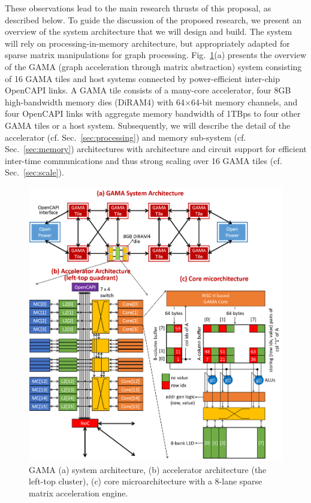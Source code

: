 These observations lead to the main research thrusts of this proposal, as described below. 
To guide the discussion of the proposed research, we present an overview of the system architecture that we will design and build. 
The system will rely on processing-in-memory architecture, but appropriately adapted for sparse matrix manipulations for graph processing. 
Fig.~\ref{fig:arch}(a) presents the overview of the GAMA (graph acceleration through matrix abstraction) system consisting of 16 GAMA tiles and host systems connected by power-efficient inter-chip OpenCAPI links.
A GAMA tile consists of a many-core accelerator, four 8GB high-bandwidth memory dies (DiRAM4) with 64$\times$64-bit memory channels, 
and four OpenCAPI links with aggregate memory bandwidth of 1TBps to four other GAMA tiles or a host system.
Subsequently, we will describe the detail of the accelerator (cf. Sec.~\ref{sec:processing}) and memory sub-system (cf. Sec.~\ref{sec:memory}) architectures with architecture and circuit support for efficient inter-time communications and thus strong scaling over 16 GAMA tiles (cf. Sec.~\ref{sec:scale}).


\begin{figure}
\center
\includegraphics[width=1.0\linewidth]{fig/arch.png}
\caption{GAMA (a) system architecture, (b) accelerator architecture (the left-top cluster), (c) core microarchitecture with a 8-lane sparse matrix acceleration engine.}
\label{fig:arch}
\end{figure}


